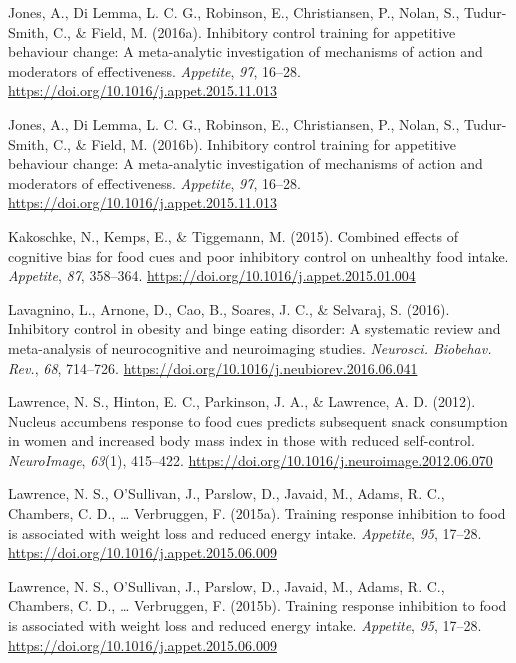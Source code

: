 \documentclass[man,floatsintext]{apa6}
\begin{document}
\leavevmode\hypertarget{ref-jones_inhibitory_2016}{}%
Jones, A., Di Lemma, L. C. G., Robinson, E., Christiansen, P., Nolan, S., Tudur-Smith, C., \& Field, M. (2016a). Inhibitory control training for appetitive behaviour change: A meta-analytic investigation of mechanisms of action and moderators of effectiveness. \emph{Appetite}, \emph{97}, 16--28. \url{https://doi.org/10.1016/j.appet.2015.11.013}

\leavevmode\hypertarget{ref-jonesInhibitoryControlTraining2016}{}%
Jones, A., Di Lemma, L. C. G., Robinson, E., Christiansen, P., Nolan, S., Tudur-Smith, C., \& Field, M. (2016b). Inhibitory control training for appetitive behaviour change: A meta-analytic investigation of mechanisms of action and moderators of effectiveness. \emph{Appetite}, \emph{97}, 16--28. \url{https://doi.org/10.1016/j.appet.2015.11.013}

\leavevmode\hypertarget{ref-kakoschke_combined_2015-1}{}%
Kakoschke, N., Kemps, E., \& Tiggemann, M. (2015). Combined effects of cognitive bias for food cues and poor inhibitory control on unhealthy food intake. \emph{Appetite}, \emph{87}, 358--364. \url{https://doi.org/10.1016/j.appet.2015.01.004}

\leavevmode\hypertarget{ref-lavagnino_inhibitory_2016}{}%
Lavagnino, L., Arnone, D., Cao, B., Soares, J. C., \& Selvaraj, S. (2016). Inhibitory control in obesity and binge eating disorder: A systematic review and meta-analysis of neurocognitive and neuroimaging studies. \emph{Neurosci. Biobehav. Rev.}, \emph{68}, 714--726. \url{https://doi.org/10.1016/j.neubiorev.2016.06.041}

\leavevmode\hypertarget{ref-lawrence_nucleus_2012-1}{}%
Lawrence, N. S., Hinton, E. C., Parkinson, J. A., \& Lawrence, A. D. (2012). Nucleus accumbens response to food cues predicts subsequent snack consumption in women and increased body mass index in those with reduced self-control. \emph{NeuroImage}, \emph{63}(1), 415--422. \url{https://doi.org/10.1016/j.neuroimage.2012.06.070}

\leavevmode\hypertarget{ref-lawrence_training_2015}{}%
Lawrence, N. S., O'Sullivan, J., Parslow, D., Javaid, M., Adams, R. C., Chambers, C. D., \ldots{} Verbruggen, F. (2015a). Training response inhibition to food is associated with weight loss and reduced energy intake. \emph{Appetite}, \emph{95}, 17--28. \url{https://doi.org/10.1016/j.appet.2015.06.009}

\leavevmode\hypertarget{ref-lawrenceTrainingResponseInhibition2015}{}%
Lawrence, N. S., O'Sullivan, J., Parslow, D., Javaid, M., Adams, R. C., Chambers, C. D., \ldots{} Verbruggen, F. (2015b). Training response inhibition to food is associated with weight loss and reduced energy intake. \emph{Appetite}, \emph{95}, 17--28. \url{https://doi.org/10.1016/j.appet.2015.06.009}
\end{document}
